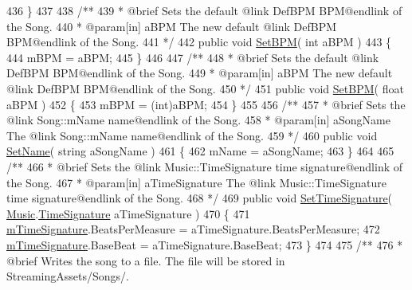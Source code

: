 \begin{DoxyCodeInclude}
436     \}
437 \textcolor{comment}{}
438 \textcolor{comment}{    /**}
439 \textcolor{comment}{     * @brief Sets the default @link DefBPM BPM@endlink of the Song.}
440 \textcolor{comment}{     * @param[in] aBPM The new default @link DefBPM BPM@endlink of the Song.}
441 \textcolor{comment}{    */}
442     \textcolor{keyword}{public} \textcolor{keywordtype}{void} \hyperlink{group___song_pub_func_gaa65bbba1af7192edff7e0f848029013b}{SetBPM}( \textcolor{keywordtype}{int} aBPM )
443     \{
444         mBPM = aBPM;
445     \}
446 \textcolor{comment}{}
447 \textcolor{comment}{    /**}
448 \textcolor{comment}{     * @brief Sets the default @link DefBPM BPM@endlink of the Song.}
449 \textcolor{comment}{     * @param[in] aBPM The new default @link DefBPM BPM@endlink of the Song.}
450 \textcolor{comment}{    */}
451     \textcolor{keyword}{public} \textcolor{keywordtype}{void} \hyperlink{group___song_pub_func_gaa65bbba1af7192edff7e0f848029013b}{SetBPM}( \textcolor{keywordtype}{float} aBPM )
452     \{
453         mBPM = (int)aBPM;
454     \}
455 \textcolor{comment}{}
456 \textcolor{comment}{    /** }
457 \textcolor{comment}{     * @brief Sets the @link Song::mName name@endlink of the Song.}
458 \textcolor{comment}{     * @param[in] aSongName The @link Song::mName name@endlink of the Song.}
459 \textcolor{comment}{    */}
460     \textcolor{keyword}{public} \textcolor{keywordtype}{void} \hyperlink{group___song_pub_func_gacb01510cf72657fc7c64bb6ba00c2c56}{SetName}( \textcolor{keywordtype}{string} aSongName )
461     \{
462         mName = aSongName;
463     \}
464 \textcolor{comment}{}
465 \textcolor{comment}{    /**}
466 \textcolor{comment}{     * @brief Sets the @link Music::TimeSignature time signature@endlink of the Song.}
467 \textcolor{comment}{     * @param[in] aTimeSignature The @link Music::TimeSignature time signature@endlink of the Song.}
468 \textcolor{comment}{    */}
469     \textcolor{keyword}{public} \textcolor{keywordtype}{void} \hyperlink{group___song_pub_func_gaf9f2c7e6f4400f6f9854e68e70a49470}{SetTimeSignature}( \hyperlink{class_music}{Music}.\hyperlink{group___music_structs_struct_music_1_1_time_signature}{TimeSignature} aTimeSignature )
470     \{
471         \hyperlink{group___song_priv_var_ga2b2dcc0e83e49f7303b6a1371877b25e}{mTimeSignature}.BeatsPerMeasure = aTimeSignature.BeatsPerMeasure;
472         \hyperlink{group___song_priv_var_ga2b2dcc0e83e49f7303b6a1371877b25e}{mTimeSignature}.BaseBeat = aTimeSignature.BaseBeat;
473     \}
474 \textcolor{comment}{}
475 \textcolor{comment}{    /** }
476 \textcolor{comment}{     * @brief Writes the song to a file. The file will be stored in StreamingAssets/Songs/.}

\end{DoxyCodeInclude}
